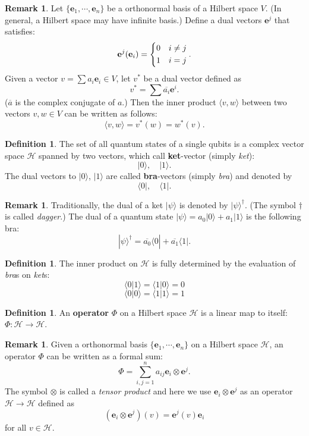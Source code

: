 \documentclass{beamer}
\theoremstyle{plain}
\theoremstyle{definition}
\newtheorem{defn}[thm]{Definition}
\newtheorem{rem}[thm]{Remark}
\begin{document}
\begin{frame}
\begin{rem}
Let $\{\mathbf e_1,\cdots,\mathbf e_n\}$ be a orthonormal basis of a Hilbert space $V$.
(In general, a Hilbert space may have infinite basis.)
Define a dual vectors $\mathbf e^j$ that satisfies:
	$$\mathbf e^j(\mathbf e_i) = \begin{dcases}
	0 & i\neq j \\
	1 & i = j \end{dcases}.$$
Given a vector $v = \sum a_i\mathbf e_i\in V$, let $v^*$ be a dual vector defined as
	$$v^* = \sum \overline{a_i}\mathbf e^i.$$
($\overline a$ is the complex conjugate of $a$.)
Then the inner product $\langle v, w\rangle$ between two vectors $v,w\in V$
can be written as follows:
	$$\langle v, w\rangle = v^*(w) = w^*(v).$$
\end{rem}
\end{frame}

\begin{frame}
\begin{defn}
The set of all quantum states of a single qubits is a complex vector space $\mathcal H$
spanned by two vectors, which call \textbf{ket}-vector (simply \textit{ket}):
	$$|0\rangle,\quad |1\rangle.$$
The dual vectors to $|0\rangle$, $|1\rangle$ are called \textbf{bra}-vectors (simply \textit{bra})
and denoted by
	$$\langle 0|, \quad \langle 1|.$$
\end{defn}
\end{frame}

\begin{frame}
\begin{rem}
Traditionally, the dual of a ket $|\psi\rangle$ is denoted by $|\psi\rangle^\dagger$. 
(The symbol $\dagger$ is called \textit{dagger}.) 
The dual of a quantum state $|\psi\rangle = a_0|0\rangle + a_1|1\rangle$ is the following bra:
	$$|\psi\rangle^\dagger = \overline{a_0}\langle 0| + \overline{a_1}\langle 1|.$$
\end{rem}
\begin{defn}
The inner product on $\mathcal H$ is fully determined by the evaluation of \textit{bra}s on \textit{ket}s:
	$$\langle 0|1\rangle = \langle 1|0\rangle = 0$$
	$$\langle 0|0\rangle = \langle 1|1\rangle = 1$$ 
\end{defn}
\end{frame}

\begin{frame}
\begin{defn}
An \textbf{operator} $\Phi$ on a Hilbert space $\mathcal H$ is a linear map to itself: $\Phi:\mathcal H\to\mathcal H$.
\end{defn}
\begin{rem}
Given a orthonormal basis $\{\mathbf e_1,\cdots,\mathbf e_n\}$ on a Hilbert space $\mathcal H$,
an operator $\Phi$ can be written as a formal sum:
	$$\Phi = \sum_{i,j=1}^n a_{ij}\mathbf e_i\otimes\mathbf e^j.$$
The symbol $\otimes$ is called a \textit{tensor product} and here we use 
$\mathbf e_i\otimes\mathbf e^j$ as an operator $\mathcal H\to\mathcal H$ defined as
	$$(\mathbf e_i\otimes\mathbf e^j)(v) = \mathbf e^j(v)\mathbf e_i$$
for all $v\in \mathcal H$.
\end{rem}
\end{frame}
\end{document}
